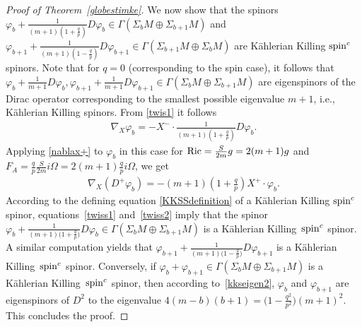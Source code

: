 \documentclass[10pt,a4paper]{amsart}
\numberwithin{equation}{section}
\theoremstyle{definition}
\begin{document}
\begin{proof}[Proof of Theorem~\ref{globestimke}]
We now show that the spinors $\varphi_{b}+\frac{1}{(m+1)\left(1+\frac{q}{p}\right)}D\varphi_{b}\in\Gamma(\Sigma_{b} M\oplus \Sigma_{b+1} M)$ and $\varphi_{b+1}+\frac{1}{(m+1)\left(1-\frac{q}{p}\right)}D\varphi_{b+1}\in\Gamma(\Sigma_{b+1} M\oplus \Sigma_{b} M)$ are K\"ahlerian Killing  ${\mathop{\rm spin}^c}$ spinors. Note that for $q=0$ (corresponding to the spin case), it follows that $\varphi_{b}+\frac{1}{m+1}D\varphi_{b}, \varphi_{b+1}+\frac{1}{m+1}D\varphi_{b+1}\in\Gamma(\Sigma_{b} M\oplus \Sigma_{b+1} M)$ are eigenspinors of the Dirac operator corresponding to the smallest possible eigenvalue $m+1$, i.e., K\"ahlerian Killing spinors. From \eqref{twis1} it follows
\begin{gather}\label{twiss1}
\nabla_X \varphi_{b}=-X^-\cdot \frac{1}{(m+1)\left(1+\frac{q}{p}\right)} D\varphi_{b}.
\end{gather}
Applying \eqref{nablax+}  to $\varphi_{b}$ in this case for ${\mathop{\rm Ric}}=\frac{S}{2m}g=2(m+1)g$ and $F_A=\frac{q}{p}\frac{S}{2m}i\Omega=2(m+1)\frac{q}{p}i\Omega$, we get
\begin{gather}\label{twiss2}
\nabla_X (D^+\varphi_{b})=-(m+1)\left(1+\frac{q}{p}\right)X^+\cdot \varphi_{b}.
\end{gather}
 According to the def\/ining  equation \eqref{KKSSdefinition} of a K\"ahlerian Killing ${\mathop{\rm spin}^c}$ spinor, equa\-tions~\eqref{twiss1} and~\eqref{twiss2} imply that the spinor $\varphi_{b}+\frac{1}{(m+1)\big(1+\frac{q}{p}\big)}D\varphi_{b}\in\Gamma(\Sigma_{b} M\oplus \Sigma_{b+1} M)$ is a  K\"ahlerian Killing~${\mathop{\rm spin}^c}$ spinor. A similar computation yields that $\varphi_{b+1}+\frac{1}{(m+1)\big(1-\frac{q}{p}\big)}D\varphi_{b+1}$ is a K\"ahlerian Killing~${\mathop{\rm spin}^c}$  spinor.  Conversely, if $\varphi_{b}+\varphi_{b+1}\in \Gamma(\Sigma_{b}M\oplus \Sigma_{b+1} M)$ is a K\"ahlerian Killing~${\mathop{\rm spin}^c}$ spinor, then according to~\eqref{kkseigen2}, $\varphi_{b}$ and $\varphi_{b+1}$ are eigenspinors of $D^2$ to the eigenvalue $4(m-b)(b+1)=\big(1-\frac{q^2}{p^2}\big)(m+1)^2$. This concludes the proof.
\end{proof}
\end{document}
